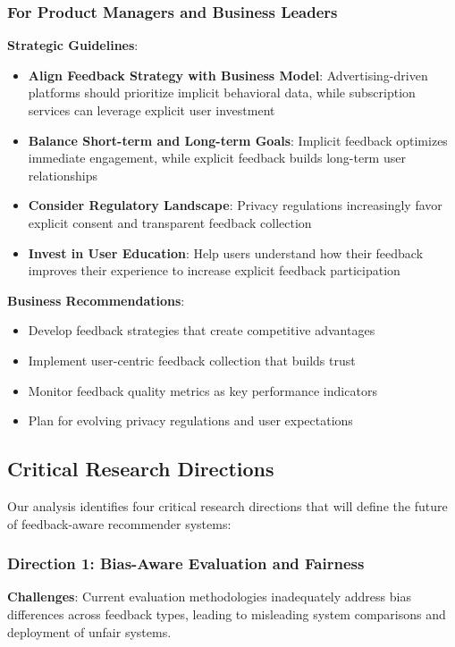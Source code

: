 \subsubsection{For Product Managers and Business Leaders}

\textbf{Strategic Guidelines}:
\begin{itemize}
    \item \textbf{Align Feedback Strategy with Business Model}: Advertising-driven platforms should prioritize implicit behavioral data, while subscription services can leverage explicit user investment
    \item \textbf{Balance Short-term and Long-term Goals}: Implicit feedback optimizes immediate engagement, while explicit feedback builds long-term user relationships
    \item \textbf{Consider Regulatory Landscape}: Privacy regulations increasingly favor explicit consent and transparent feedback collection
    \item \textbf{Invest in User Education}: Help users understand how their feedback improves their experience to increase explicit feedback participation
\end{itemize}

\textbf{Business Recommendations}:
\begin{itemize}
    \item Develop feedback strategies that create competitive advantages
    \item Implement user-centric feedback collection that builds trust
    \item Monitor feedback quality metrics as key performance indicators
    \item Plan for evolving privacy regulations and user expectations
\end{itemize}

\subsection{Critical Research Directions}

Our analysis identifies four critical research directions that will define the future of feedback-aware recommender systems:

\subsubsection{Direction 1: Bias-Aware Evaluation and Fairness}

\textbf{Challenges}:
Current evaluation methodologies inadequately address bias differences across feedback types, leading to misleading system comparisons and deployment of unfair systems.

